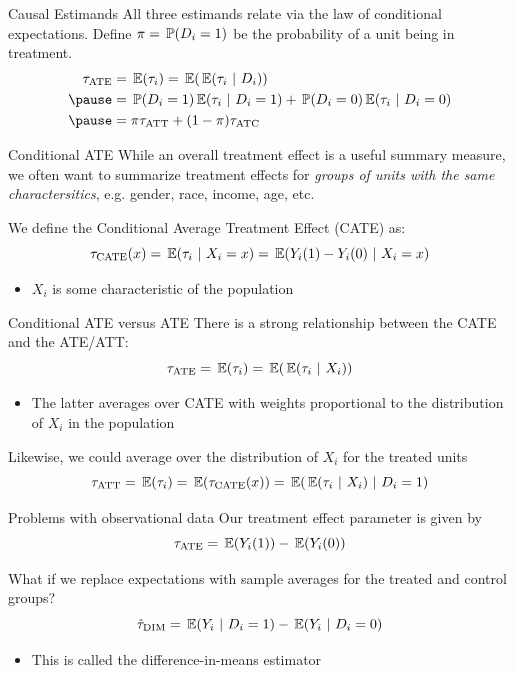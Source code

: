\documentclass[aspectratio=169,t,11pt,table]{beamer}
\begin{document}
\begin{frame}{Causal Estimands}
  All three estimands relate via the law of conditional expectations. Define $\pi = \prob{D_i = 1}$ be the probability of a unit being in treatment. 
  \begin{align*}
    \tau_{\text{ATE}} 
    &= \expec{\tau_i} = \expec{\expec{\tau_i}{D_i}} \\
    \pause
    &= \prob{D_i = 1} \expec{\tau_i}{D_i = 1} + \prob{D_i = 0} \expec{\tau_i}{D_i = 0} \\
    \pause
    &= \pi \tau_{\text{ATT}} + (1 - \pi) \tau_{\text{ATC}}  
  \end{align*}
\end{frame}

\begin{frame}{Conditional ATE}
  While an overall treatment effect is a useful summary measure, we often want to summarize treatment effects for \emph{groups of units with the same charactersitics}, e.g. gender, race, income, age, etc.
  
  \bigskip
  We define the \alert{Conditional Average Treatment Effect} (CATE) as:
  $$
    \tau_{\text{CATE}}(x) = \expec{\tau_i}{X_i = x} = \expec{Y_i(1) - Y_i(0)}{X_i = x}
  $$
  \begin{itemize}
    \item $X_i$ is some characteristic of the population
  \end{itemize}
\end{frame}

\begin{frame}{Conditional ATE versus ATE}
  There is a strong relationship between the CATE and the ATE/ATT:
  $$
    \tau_{\text{ATE}} = \expec{\tau_i} = \expec{\expec{\tau_i}{X_i}}
  $$
  \begin{itemize}
    \item The latter averages over CATE with weights proportional to the distribution of $X_i$ in the population
  \end{itemize}


  \pause
  \bigskip
  Likewise, we could average over the distribution of $X_i$ for the treated units
  $$
    \tau_{\text{ATT}} = \expec{\tau_i} = \expec{\tau_{\text{CATE}}(x)} = \expec{\expec{\tau_i}{X_i}}{D_i = 1}
  $$
\end{frame}

\begin{frame}{Problems with observational data}
  Our treatment effect parameter is given by 
  $$
    \tau_{\text{ATE}} = \expec{Y_{i}(1)} - \expec{Y_{i}(0)}
  $$
  
  \bigskip
  What if we replace expectations with sample averages for the treated and control groups?
  $$
    \hat{\tau}_{\text{DIM}} = \expec{Y_{i}}{D_i = 1} - \expec{Y_{i}}{D_i = 0}
  $$
  \begin{itemize}
    \item This is called the \alert{difference-in-means estimator}
  \end{itemize}
\end{frame}
\end{document}
